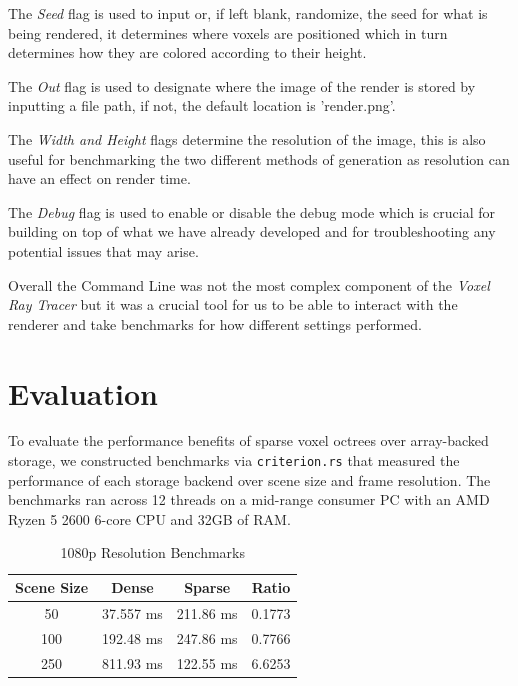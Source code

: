 \documentclass[conference]{IEEEtran}
\begin{document}
The \textit{Seed} flag is used to input or, if left blank, randomize, the seed for what is being rendered, it determines where voxels are positioned which in turn determines how they are colored according to their height.

The \textit{Out} flag is used to designate where the image of the render is stored by inputting a file path, if not, the default location is 'render.png'.

The \textit{Width and Height} flags determine the resolution of the image, this is also useful for benchmarking the two different methods of generation as resolution can have an effect on render time.

The \textit{Debug} flag is used to enable or disable the debug mode which is crucial for building on top of what we have already developed and for troubleshooting any potential issues that may arise.

Overall the Command Line was not the most complex component of the \textit{Voxel Ray Tracer} but it was a crucial tool for us to be able to interact with the renderer and take benchmarks for how different settings performed.

\section{Evaluation}

To evaluate the performance benefits of sparse voxel octrees over array-backed storage, we constructed benchmarks via \verb|criterion.rs| that measured the performance of each storage backend over scene size and frame resolution.
The benchmarks ran across 12 threads on a mid-range consumer PC with an AMD Ryzen 5 2600 6-core CPU and 32GB of RAM.

\begin{table}[htbp]
\caption{1080p Resolution Benchmarks}
\begin{center}
\begin{tabular}{|c|c|c|c|}
\hline
\textbf{Scene Size} & \textbf{Dense} & \textbf{Sparse}  & \textbf{Ratio} \\\hline 
50 & 37.557 ms & 211.86 ms & 0.1773 \\\hline
100 & 192.48 ms & 247.86 ms & 0.7766 \\\hline
250 & 811.93 ms & 122.55 ms & 6.6253 \\\hline
\end{tabular}
\label{1080p-bench}
\end{center}
\end{table}
\end{document}
